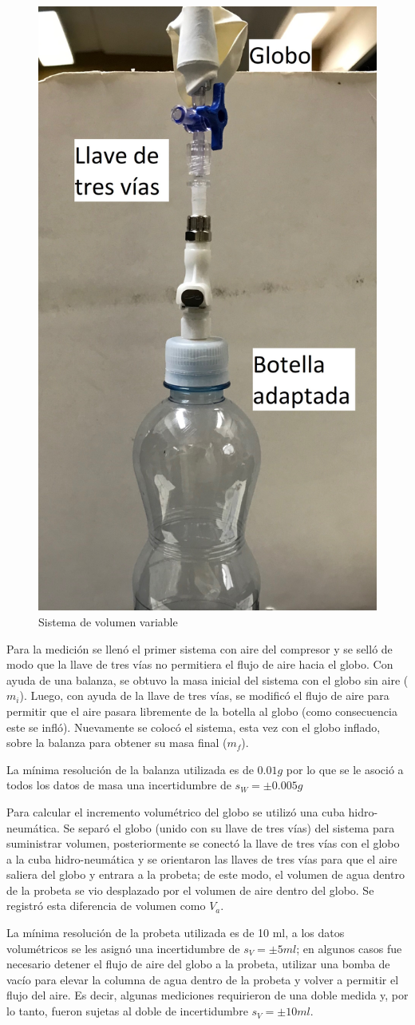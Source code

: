 \documentclass[a4paper]{article}
\begin{document}
\begin{figure}[H]
    \centering
    \includegraphics[width=5 cm]{Botella-Globo.JPG}
    \caption{Sistema de volumen variable}
\end{figure}

Para la medición se llenó el primer sistema con aire del compresor y se selló de modo que la llave de tres vías no permitiera el flujo de aire hacia el globo. Con ayuda de una balanza, se obtuvo la masa inicial del sistema con el globo sin aire ($m_{i}$). Luego, con ayuda de la llave de tres vías, se modificó el flujo de aire para permitir que el aire pasara libremente de la botella al globo (como consecuencia este se infló). Nuevamente se colocó el sistema, esta vez con el globo inflado, sobre la balanza para obtener su masa final ($m_{f}$).

La mínima resolución de la balanza utilizada es de $0.01 g$ por lo que se le asoció a todos los datos de masa una incertidumbre de $s_{W} = \pm 0.005 g$

Para calcular el incremento volumétrico del globo se utilizó una cuba hidro-neumática. Se separó el globo (unido con su llave de tres vías) del sistema para suministrar volumen, posteriormente se conectó la llave de tres vías con el globo a la cuba hidro-neumática y se orientaron las llaves de tres vías para que el aire saliera del globo y entrara a la probeta; de este modo, el volumen de agua dentro de la probeta se vio desplazado por el volumen de aire dentro del globo. Se registró esta diferencia de volumen como $V_{a}$.

La mínima resolución de la probeta utilizada es de 10 ml, a los datos volumétricos se les asignó una incertidumbre de $s_{V} = \pm 5ml$; en algunos casos fue necesario detener el flujo de aire del globo a la probeta, utilizar una bomba de vacío para elevar la columna de agua dentro de la probeta y volver a permitir el flujo del aire. Es decir, algunas mediciones requirieron de una doble medida y, por lo tanto, fueron sujetas al doble de incertidumbre $s_{V} = \pm 10ml$.
\end{document}
